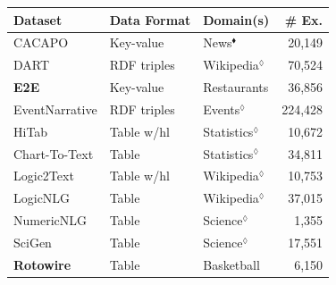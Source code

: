 \begin{table}[t]
    \centering\small
    \begin{tabular}{@{}lllr@{}}
        \toprule
        \textbf{Dataset}                                                                           & \textbf{Data Format} & \textbf{Domain(s)}      & \textbf{\# Ex.} \\  \midrule
        CACAPO \cite{vanderleeCACAPODatasetMultilingual2020}                                       & Key-value            & News$^\blacklozenge$    & 20,149          \\
        DART \cite{nan2021dart}                                                                    & RDF triples          & Wikipedia$^\lozenge$    & 70,524          \\
        \textbf{E2E} \cite{dusekSemanticNoiseMatters2019,dusekEvaluatingStateoftheartEndtoEnd2020} & Key-value            & Restaurants             & 36,856          \\
        EventNarrative \cite{colas2021eventnarrative}                                              & RDF triples          & Events$^\lozenge$       & 224,428         \\
        HiTab \cite{chengHiTabHierarchicalTable2021}                                               & Table w/hl           & Statistics$^\lozenge$   & 10,672          \\
        Chart-To-Text \cite{kantharajCharttoTextLargeScaleBenchmark2022}                           & Table                & Statistics$^\lozenge$   & 34,811          \\
        Logic2Text \cite{chenLogic2TextHighFidelityNatural2020}                                    & Table w/hl           & Wikipedia$^\lozenge$    & 10,753          \\
        LogicNLG \cite{chenLogicalNaturalLanguage2020}                                             & Table                & Wikipedia$^\lozenge$    & 37,015          \\
        NumericNLG \cite{suadaaTabletoTextGenerationNumerical2021}                                 & Table                & Science$^\lozenge$      & 1,355           \\
        SciGen \cite{moosaviLearningReasonText2021}                                                & Table                & Science$^\lozenge$      & 17,551          \\
        \textbf{Rotowire} \cite{wiseman2017challenges}                                             & Table                & Basketball              & 6,150           \\

\end{tabular}
\end{table}
